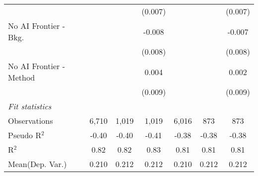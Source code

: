 \begin{tabular}{lcccccc}
                           &                &         & (0.007) &                &         & (0.007)\\   
   No AI Frontier - Bkg.   &                &         & -0.008  &                &         & -0.007\\   
                           &                &         & (0.008) &                &         & (0.008)\\   
   No AI Frontier - Method &                &         & 0.004   &                &         & 0.002\\   
                           &                &         & (0.009) &                &         & (0.009)\\   
   \midrule
   \emph{Fit statistics}\\
   Observations            & 6,710          & 1,019   & 1,019   & 6,016          & 873     & 873\\  
   Pseudo R$^2$            & -0.40          & -0.40   & -0.41   & -0.38          & -0.38   & -0.38\\  
   R$^2$                   & 0.82           & 0.82    & 0.83    & 0.81           & 0.81    & 0.81\\  
Mean(Dep. Var.) & 0.210 & 0.212 & 0.212 & 0.210 & 0.212 & 0.212 \\
   

\end{tabular}

